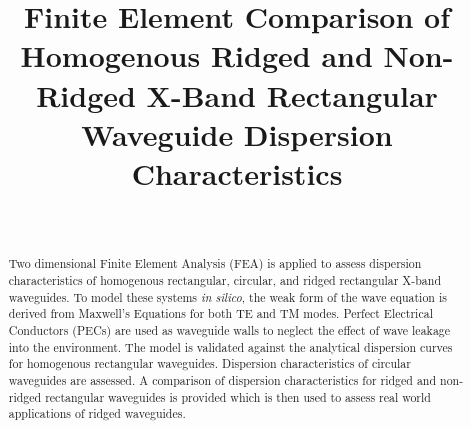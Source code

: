 \documentclass[journal]{IEEEtran}
\begin{document}
\title{Finite Element Comparison of Homogenous Ridged and Non-Ridged X-Band Rectangular Waveguide Dispersion Characteristics}

\author{
\\
}

\maketitle

\begin{abstract}
Two dimensional Finite Element Analysis (FEA) is applied to assess dispersion characteristics of homogenous rectangular, circular, and ridged rectangular X-band waveguides. To model these systems \textit{in silico}, the weak form of the wave equation is derived from Maxwell's Equations for both TE and TM modes. Perfect Electrical Conductors (PECs) are used as waveguide walls to neglect the effect of wave leakage into the environment. The model is validated against the analytical dispersion curves for homogenous rectangular waveguides. Dispersion characteristics of circular waveguides are assessed. A comparison of dispersion characteristics for ridged and non-ridged rectangular waveguides is provided which is then used to assess real world applications of ridged waveguides. 
\end{abstract}

\IEEEpeerreviewmaketitle

%




%




\end{document}
